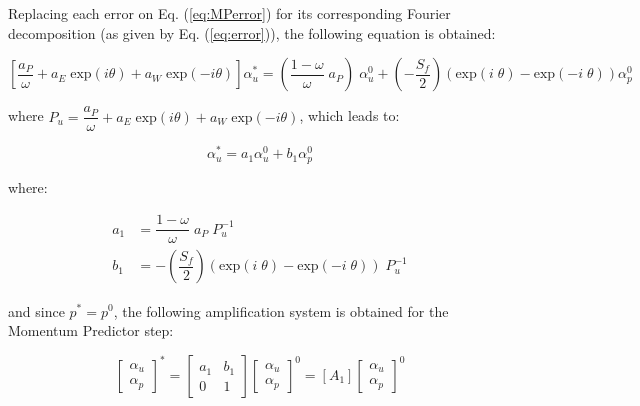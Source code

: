 \documentclass[final,3p,times,11pt,onecolumn]{myElsarticle}
\numberwithin{equation}{section}
\begin{document}
Replacing each error on Eq. (\ref{eq:MPerror}) for its corresponding Fourier decomposition (as given by Eq. (\ref{eq:error})), the following equation is obtained:

\begin{equation}
    \left[ \dfrac{a_P}{\omega}  + a_E \; \text{exp} (i \theta) + a_W \; \text{exp} (-i \theta) \right] \alpha_u^* = \left( \dfrac{1-\omega}{\omega} \; a_P \right) \; \alpha_u^0 + \left(- \dfrac{S_f}{2} \right) \left(\text{exp} \left(i \; \theta \right) -  \text{exp} \left(-i \; \theta \right) \right) \alpha_p^0
    \label{eq:MPfou}
\end{equation}

\noindent where $P_u = \dfrac{a_P}{\omega}  + a_E \; \text{exp} (i \theta) + a_W \; \text{exp} (-i \theta)$, which leads to:

\begin{equation}
     \alpha_u^* = a_1 \alpha_u^0 + b_1 \alpha_p^0
    \label{eq:MPfou2}
\end{equation}

\noindent where:

\begin{equation}
\begin{split}
     a_1 &= \dfrac{1-\omega}{\omega} \; a_P \; P_u^{-1} \\
     b_1 &= - \left( \dfrac{S_f}{2} \right) \left( \text{exp} \left(i \; \theta \right) -  \text{exp} \left(-i \; \theta \right) \right) \; P_u^{-1}
\end{split}
\end{equation}

\noindent and since $p^* = p^0$, the following amplification system is obtained for the Momentum Predictor step:

\begin{equation}
\begin{bmatrix}
\alpha_u \\
\alpha_p 
\end{bmatrix}^{*} =
\begin{bmatrix}
a_1 & b_1 \\
0 & 1
\end{bmatrix}
\begin{bmatrix}
\alpha_u \\
\alpha_p 
\end{bmatrix}^{0} =
[A_1]
\begin{bmatrix}
\alpha_u \\
\alpha_p 
\end{bmatrix}^{0}
\end{equation}
\end{document}
